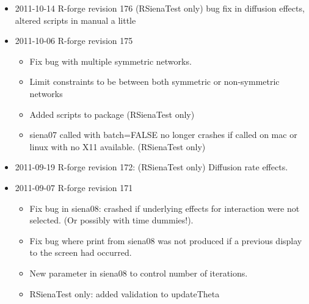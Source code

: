 \documentclass[a4paper,fleqn,11pt]{article}
\newcommand{\+}{\, + \,}
\begin{document}
{\begin{small}
\begin{itemize}
\begin{itemize}
\item Change to covariance matrix for effects which have been fixed
\item Added new package for parallel running to be used from R 2.14.0. New
  option to use forking processes on non-Windows platforms.
\item Changes from revision 175 copied to RSiena
\item Updates to maximum likelihood estimation: NB this is still under
  development, and should not be used with missing data.
\item Added bayes, updateTheta functions to RSiena
\item sienaTimeTest for finite differences or ML now in RSiena
\item Space saving matrices used for derivatives in RSiena now, and optional by
  wave in ML.
\end{itemize}
\item 2011-10-14 R-forge revision 176 (RSienaTest only)
bug fix in diffusion effects, altered scripts in manual a little
\item 2011-10-06 R-forge revision 175
\begin{itemize}
\item Fix bug with multiple symmetric networks.
\item Limit constraints to be between both symmetric or non-symmetric networks
\item Added scripts to package (RSienaTest only)
\item siena07 called with batch=FALSE no longer crashes if called on mac or
linux with no X11 available. (RSienaTest only)
\end{itemize}
\item 2011-09-19 R-forge revision 172: (RSienaTest only) Diffusion rate effects.
\item 2011-09-07 R-forge revision 171
\begin{itemize}
\item Fix bug in siena08: crashed if underlying effects for interaction were not
  selected. (Or possibly with time dummies!).
\item Fix bug where print from siena08 was not produced if a previous display to
  the screen had occurred.
\item New parameter in siena08 to control number of iterations.
\item RSienaTest only: added validation to updateTheta
\end{itemize}

\end{itemize}
\end{small}}
\end{document}
